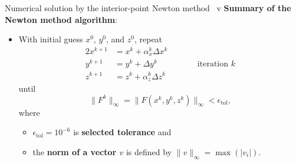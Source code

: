 \begin{frame}{Numerical solution by the interior-point Newton method \, v}
\vskip 10pt
\alert{\bf Summary of the Newton method algorithm}: \\[5pt]

\begin{itemize} 
%
\item With initial guess $x^{0}$, $y^{0}$, and $z^{0}$, repeat
%
\begin{alignat*}{2}
x^{k+1} & =x^{k}+\alpha_{x}^{k}\Delta x^{k}\\
y^{k+1} & =y^{k}+\Delta y^{k} & \qquad & \text{iteration }k\\
z^{k+1} & =z^{k}+\alpha_{z}^{k}\Delta z^{k}
\end{alignat*}
%
%
until
\[
\|F^{k}\|_{\infty}=\|F(x^{k},y^{k},z^{k})\|_{\infty}<\epsilon_{\mathrm{tol}},
\]
where
% 
\begin{itemize} 
\item $\epsilon_{\text{tol}}=10^{-6}$ is {\bf selected tolerance} and \item the {\bf norm of a vector $v$} is defined by
%
$
\|v\|_{\infty}=\max(|v_{i}|).
$
\end{itemize} 

\end{itemize} 

\end{frame}
%